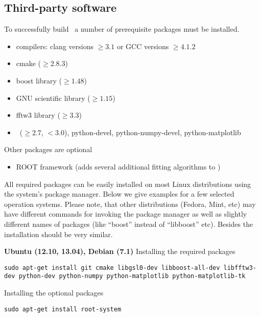 \subsection{Third-party software}
To successfully build \BornAgain\ a number of prerequisite packages must be installed.

\begin{itemize}
\item compilers: clang  versions $\geq 3.1$ or GCC versions $\geq 4.1.2$
\item cmake ($\geq 2.8.3$)
\item boost library ($\geq 1.48$)
\item GNU scientific library ($\geq 1.15$)
\item fftw3 library ($\geq 3.3$)
\item \Python\ ($\geq 2.7$, $< 3.0$), python-devel, python-numpy-devel, python-matplotlib
\end{itemize}
\vspace*{2mm}

Other packages are optional
\begin{itemize}
\item ROOT framework (adds several additional fitting algorithms to \BornAgain)
\end{itemize}

All required packages can be easily installed on most Linux distributions using the system's package
manager. Below we give examples for a few selected operation systems. Please note,
that other distributions (Fedora, Mint, etc) may have different
commands for invoking the package manager as well as slightly different names of packages (like ``boost'' instead of ``libboost'' etc). Besides  the installation should be very similar.
\vspace*{3mm}


\noindent
{\large\bf Ubuntu (12.10, 13.04), Debian (7.1)} \newline
Installing the required packages
\begin{lstlisting}[language=shell, style=commandline]
sudo apt-get install git cmake libgsl0-dev libboost-all-dev libfftw3-dev python-dev python-numpy python-matplotlib python-matplotlib-tk
\end{lstlisting}

\noindent
Installing the optional packages
\begin{lstlisting}[language=shell, style=commandline]
sudo apt-get install root-system
\end{lstlisting}
\vspace*{3mm}


